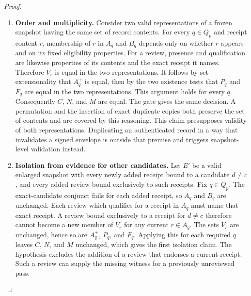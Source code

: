 \begin{proof}
\begin{enumerate}
\item \textbf{Order and multiplicity.}
Consider two valid representations of a frozen snapshot
having the same set of record contents.
For every $q\in Q_p$ and receipt content $r$,
membership of $r$ in $A_q$ and $B_q$ depends only
on whether $r$ appears and on its fixed eligibility properties.
For a review, presence and qualification are likewise
properties of its contents and the exact receipt it names.
Therefore $V_r$ is equal in the two representations.
It follows by set extensionality that $A_q^+$ is equal,
then by the two existence tests that $P_q$ and $F_q$
are equal in the two representations.
This argument holds for every $q$.
Consequently $C$, $N$, and $M$ are equal.
The gate gives the same decision.
A permutation and the insertion of exact duplicate copies
both preserve the set of contents and are covered by this reasoning.
This claim presupposes validity of both representations.
Duplicating an authenticated record in a way that invalidates
a signed envelope is outside that premise and triggers
snapshot-level validation instead.

\item \textbf{Isolation from evidence for other candidates.}
Let $E'$ be a valid enlarged snapshot with every newly added
receipt bound to a candidate $d\ne c$, and every added review
bound exclusively to such receipts.
Fix $q\in Q_p$.
The exact-candidate conjunct fails for each added receipt,
so $A_q$ and $B_q$ are unchanged.
Each review which qualifies for a receipt in $A_q$ must
name that exact receipt.
A review bound exclusively to a receipt for $d\ne c$
therefore cannot become a new member of $V_r$
for any current $r\in A_q$.
The sets $V_r$ are unchanged, hence so are
$A_q^+$, $P_q$, and $F_q$.
Applying this for each required $q$ leaves
$C$, $N$, and $M$ unchanged, which gives the first
isolation claim.
The hypothesis excludes the addition of a review that
endorses a current receipt. Such a review can supply the
missing witness for a previously unreviewed pass.


\end{enumerate}
\end{proof}
